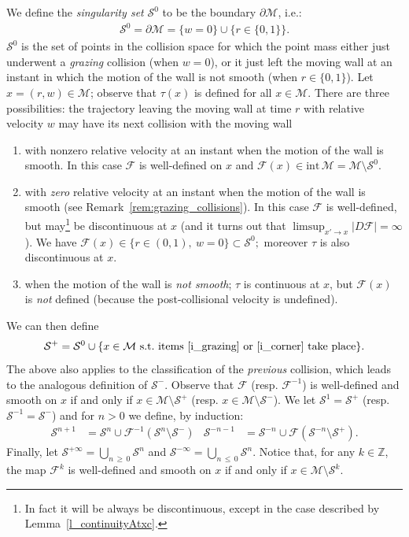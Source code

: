 \documentclass[10pt]{amsart}
\theoremstyle{definition}\newtheorem{defi}[theo]{Definition}\newtheorem{rema}[theo]{Remark}\newtheorem{exam}[theo]{Example}\newtheorem{exem}[theo]{Example}\newtheorem{nota}[theo]{Notation}
\newcommand{\ct}{r}
\newcommand{\fft}{\tau}
\newcommand{\st}{\ \text{s.t.}\ }
\newcommand{\intr}[1]{\mathrm{int}\,#1}
\newcommand{\inv}{^{-1}}
\newcommand{\bZ}{\mathbb{Z}}
\newcommand{\cm}{\mathcal{F}}
\newcommand{\csp}{\mathcal{M}}
\newcommand{\singPrivate}{\mathcal{S}}
\newcommand{\sing}[1]{\singPrivate^{#1}}
\newcommand{\singForward}[1]{\singPrivate^+_{#1}}
\newcommand{\singBackward}[1]{\singPrivate^-_{#1}}
\newcommand*{\relabel}{\renewcommand{\labelenumi}{(\theenumi)}}
\newcommand*{\alphenumi}{\renewcommand*{\theenumi}{\alph{enumi}}\relabel}
\begin{document}
We define the \emph{singularity set} $\sing0$ to be the boundary $\partial\csp$, i.e.:
\begin{align*}
\sing{0} = \partial\csp =\{w = 0\}\cup \{\ct \in \{0,1\}\}.
\end{align*}
$\sing{0}$ is the set of points in the collision space for which the point mass either just underwent a \emph{grazing} collision (when $w = 0$), or it just left the moving wall at an instant in which the motion of the wall is not smooth (when $r\in\{0,1\}$). Let $x = (\ct,w)\in\csp$; observe that $\fft(x)$ is defined for all $x\in\csp$. There are three possibilities: the trajectory leaving the moving wall at time $\ct$ with relative velocity $w$ may have its next collision with the moving wall
\begin{enumerate}\alphenumi
\item \label{i_regular}
with nonzero relative velocity at an instant when the motion of the wall is smooth. In this case $\cm$ is well-defined on $x$ and $\cm(x)\in\intr\csp = \csp\setminus\sing{0}$.
\item \label{i_grazing}
with \emph{zero} relative velocity at an instant when the motion of the wall is smooth (see Remark~\ref{rem:grazing_collisions}). In this case $\cm$ is well-defined, but may\footnote{In fact it will be always be discontinuous, except in the case described by Lemma~\ref{l_continuityAtxc}.} be discontinuous at $x$ (and it turns out that $ \limsup_{x'\to x}|D \cm|= \infty$). We have $
\cm(x)\in\{r\in(0,1),\ w = 0\}\subset\sing0; $ moreover $\fft$ is also discontinuous at $x$.
\item \label{i_corner}
when the motion of the wall is \emph{not smooth}; $\fft$ is continuous at $x$, but $\cm(x)$ is \emph{not} defined (because the post-collisional velocity is undefined).
\end{enumerate}

We can then define
\begin{align*}
\singForward{} =\sing0 \cup \{x\in\csp\st \text{items~\eqref{i_grazing} {or}~\eqref{i_corner} take place}\}.
\end{align*}
The above also applies to the classification of the \emph{previous} collision, which leads to the analogous definition of $\singBackward{}$. Observe that $\cm$ (resp. $\cm\inv$) is well-defined and smooth on $x$ if and only if $x\in\csp\setminus\singForward{}$ (resp. $x\in\csp\setminus\singBackward{}$). We let $\sing1 = \singForward{}$ (resp. $\sing{-1} = \singBackward{}$) and for $n > 0$ we define, by induction:
\begin{align*}
\sing{n+1} & =\sing{n}\cup\cm\inv(\sing{n}\setminus\singBackward{}) &
\sing{-n-1} & =\sing{-n}\cup\cm\left(\sing{-n}\setminus\singForward{}\right).
\end{align*}
Finally, let $\sing{+\infty} = \bigcup_{n\,\ge\,0}\sing n$ and $\sing{-\infty} = \bigcup_{n\,\le\,0}\sing n$. Notice that, for any $k\in\bZ$, the map $\cm^{k}$ is well-defined and smooth on $x$ if and only if $x\in\csp\setminus\sing{k}$.
\end{document}
